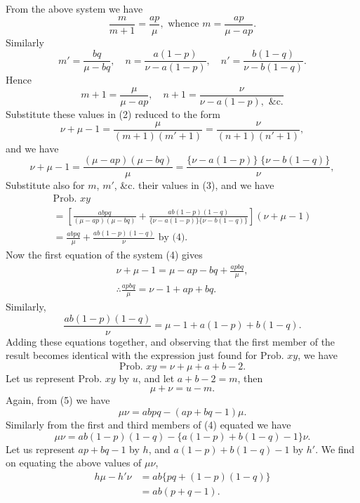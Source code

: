 \documentclass[oneside]{book}
\begin{document}
From the above system we have
\begin{equation*}
\frac{m}{m+1}=\frac{ap}{\mu}, \text{ whence } m=\frac{ap}{\mu-ap}.
\end{equation*}
Similarly
\[
  m'= \frac{bq}{\mu-bq},\quad
  n = \frac{a(1-p)}{\nu - a(1-p)},\quad
  n'= \frac{b(1-q)}{\nu - b(1-q)}.
\]
Hence
\[
  m + 1 = \frac{\mu}{\mu-ap},\quad
  n + 1 = \frac{\nu}{\nu - a(1-p), \text{ \&c.}}
\]
Substitute these values in (2) reduced to the form
\[
  \nu + \mu - 1 = \frac{\mu}{(m+1)(m'+1)} = \frac{\nu}{(n+1)(n'+1)},
\]
and we have
\[
  \nu + \mu - 1 = \frac{(\mu-ap)(\mu-bq)}{\mu}
  = \frac{\{\nu - a(1-p)\}\; \{\nu - b(1-q)\}}{\nu},  \tag{4}
\]
Substitute also for $m$, $m'$, \&c. their values in (3), and we have
\begin{gather*}
  \text{Prob. }xy   \\
  = \left[ \frac{abpq}{(\mu-ap)(\mu-bq)}
         + \frac{ab(1-p)(1-q)}
                {\{\nu - a(1-p)\} \{\nu - b(1-q)\}}\right]
    (\nu + \mu - 1)   \\
  = \frac{abpq}{\mu} + \frac{ab(1-p)(1-q)}{\nu} \text{ by (4).}
\end{gather*}
Now the first equation of the system (4) gives
\begin{gather*}
  \nu + \mu - 1 = \mu - ap - bq + \frac{apbq}{\mu},  \tag{5}  \\
  \therefore \frac{apbq}{\mu} = \nu - 1 + ap + bq.
\end{gather*}
Similarly,
\[
  \frac{ab(1-p)(1-q)}{\nu} = \mu - 1 + a(1-p) + b(1-q).
\]
Adding these equations together, and observing that the first
member of the result becomes identical with the expression just
found for Prob. $xy$, we have
\[
  \text{Prob. }xy = \nu + \mu + a + b - 2.
\]
Let us represent Prob. $xy$ by $u$, and let $a + b - 2 = m$, then
\[
  \mu + \nu = u - m.  \tag{6}
\]
Again, from (5) we have
\[
  \mu\nu = abpq - (ap + bq - 1)\mu.  \tag{7}
\]
Similarly from the first and third members of (4) equated we
have
\begin{equation*}
\mu \nu = ab(1-p)(1-q) - \{a(1-p)+b(1-q)-1\}\nu.
\end{equation*}
Let us represent $ap + bq - 1$ by $h$, and $a(1 - p) + b(1 - q) - 1$ by
$h'$. We find on equating the above values of $\mu \nu$,
\begin{align*}
h \mu - h'\nu &= ab \{pq + (1-p)(1-q)\}  \\
              &= ab(p + q - 1).
\end{align*}
\end{document}
